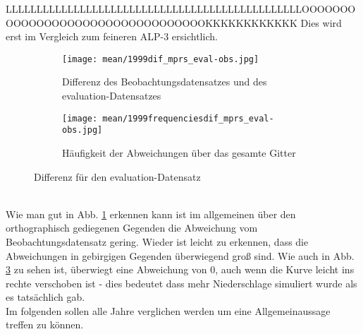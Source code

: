 LLLLLLLLLLLLLLLLLLLLLLLLLLLLLLLLLLLLLLLLLLLLLLLLOOOOOOOOOOOOOOOOOOOOOOOOOOOOOOOOOKKKKKKKKKKKK Dies wird erst im Vergleich zum feineren ALP-3 ersichtlich.\hfill\\

\begin{figure}[h]
	\centering
	\begin{subfigure}[b]{0.49\textwidth}
		\centering
		\texttt{[image: mean/1999dif\_mprs\_eval-obs.jpg]}
		\caption{Differenz des Beobachtungsdatensatzes und des evaluation-Datensatzes}
		\label{fig:eval_dif}
	\end{subfigure}
	\begin{subfigure}[b]{0.49\textwidth}
		\centering
		\texttt{[image: mean/1999frequenciesdif\_mprs\_eval-obs.jpg]}
		\caption{Häufigkeit der Abweichungen über das gesamte Gitter}
		\label{fig:eval_freq_dif}
	\end{subfigure}
	\caption{Differenz für den evaluation-Datensatz}
\end{figure}

\hfill\\
Wie man gut in Abb. \ref{fig:eval_dif} erkennen kann ist im allgemeinen über den orthographisch gediegenen Gegenden die Abweichung vom Beobachtungsdatensatz gering. Wieder ist leicht zu erkennen, dass die Abweichungen in gebirgigen Gegenden überwiegend groß sind. Wie auch in Abb. \ref{fig:eval_freq_dif} zu sehen ist, überwiegt eine Abweichung von 0, auch wenn die Kurve leicht ins rechte verschoben ist - dies bedeutet dass mehr Niederschlage simuliert wurde als es tatsächlich gab.\\
Im folgenden sollen alle Jahre verglichen werden um eine Allgemeinaussage treffen zu können.